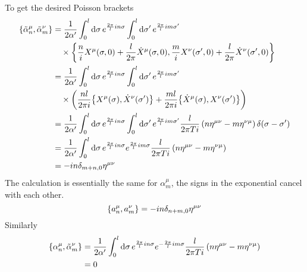 To get the desired Poisson brackets
\begin{align}
	\acomm{\tilde{\alpha}^\mu_n}{\tilde{\alpha}^\nu_m} &= \frac{1}{{2\alpha'}} \int_0^l \dd{\sigma} e^{\frac{2\pi}{l} in \sigma}  \int_0^l \dd{\sigma'} e^{\frac{2\pi}{l} im \sigma'} \notag \\
																		&\quad \times \acomm{\frac{n}{i} X^\mu(\sigma,0) + \frac{l}{2\pi} \dot{X}^\mu(\sigma,0)}{\frac{m}{i} X^\nu(\sigma',0) + \frac{l}{2\pi} \dot{X}^\nu(\sigma',0)} \notag\\
&= \frac{1}{{2\alpha'}} \int_0^l \dd{\sigma} e^{\frac{2\pi}{l} in \sigma}  \int_0^l \dd{\sigma'} e^{\frac{2\pi}{l} im \sigma'} \notag\\
&\quad \times  \left( \frac{nl}{2\pi i} \acomm{X^\mu(\sigma)}{\dot{X}^\nu(\sigma')} + \frac{ml}{2\pi i} \acomm{\dot{X}^\mu(\sigma)}{X^\nu(\sigma')} \right) \notag\\
&= \frac{1}{{2\alpha'}} \int_0^l \dd{\sigma} e^{\frac{2\pi}{l} in \sigma}  \int_0^l \dd{\sigma'} e^{\frac{2\pi}{l} im \sigma'} \frac{l}{2\pi T i }\left( n \eta^{\mu\nu} - m \eta^{\nu\mu}  \right) \delta(\sigma - \sigma') \notag\\
&= \frac{1}{{2\alpha'}} \int_0^l \dd{\sigma} e^{\frac{2\pi}{l} in \sigma}   e^{\frac{2\pi}{l} im \sigma} \frac{l}{2\pi T i }\left( n \eta^{\mu\nu} - m \eta^{\nu\mu}  \right) \notag\\ 
&= -i n \delta_{m+n,0} \eta^{\mu\nu}
\end{align}
The calculation is essentially the same for $\alpha_m^\mu$, the signs in the exponential cancel with each other.
\begin{equation}
	\acomm{a_n^\mu}{a_m^\nu} = -in \delta_{n+m,0}\eta^{\mu\nu}
\end{equation}
Similarly
\begin{align}
	\acomm{\alpha^\mu_n}{\tilde{\alpha}_m^\nu} &= \frac{1}{{2\alpha'}} \int_0^l \dd{\sigma} e^{\frac{2\pi}{l} in \sigma}   e^{-\frac{2\pi}{l} im \sigma} \frac{l}{2\pi T i }\left( n \eta^{\mu\nu} - m \eta^{\nu\mu}  \right) \notag\\  
															 &= 0
\end{align}

